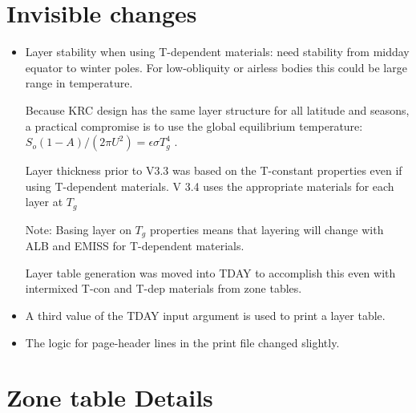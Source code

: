 \documentclass{article}
\begin{document}
\section{Invisible changes \label{invis}} 
\begin{itemize}      %

 \item Layer stability when using T-dependent materials: need stability from
   midday equator to winter poles. For low-obliquity or airless bodies this
   could be large range in temperature.

Because KRC design has the same layer structure for all latitude and seasons, a
practical compromise is to use the global equilibrium temperature: $ S_o
(1-A)/(2 \pi U^2)= \epsilon \sigma T_g^4$ .

Layer thickness prior to V3.3 was based on the T-constant properties even if
using T-dependent materials.  V 3.4 uses the appropriate materials for each
layer at $T_g$

Note: Basing layer on $T_g$ properties means that layering will change with ALB
and EMISS for T-dependent materials.

Layer table generation was moved into TDAY to accomplish this even with
intermixed T-con and T-dep materials from zone tables.

\item  A third value of the TDAY input argument is used to print a layer table.

\item  The logic for page-header lines in the print file changed slightly.

\end{itemize}

\section{Zone table Details \label{devd}} %
\end{document}
